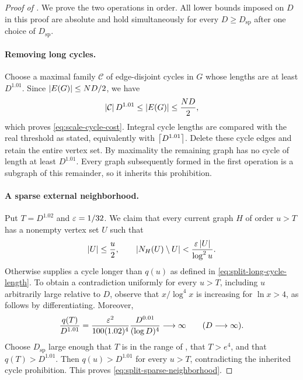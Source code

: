 \begin{proof}[Proof of ]
We prove the two operations in order.  All lower bounds imposed on $D$
in this proof are absolute and hold simultaneously for every
$D\ge D_{\mathrm{sp}}$ after one choice of $D_{\mathrm{sp}}$.

\paragraph{Removing long cycles.}
Choose a maximal family $\mathcal C$ of edge-disjoint cycles in $G$
whose lengths are at least $D^{1.01}$.  Since
$\left|E(G)\right|\le ND/2$, we have
\[
  \left|\mathcal C\right|D^{1.01}\le\left|E(G)\right|\le\frac{ND}{2},
\]
which proves \eqref{eq:scale-cycle-cost}.  Integral cycle lengths are
compared with the real threshold as stated, equivalently with
$\left\lceil D^{1.01}\right\rceil$.  Delete these cycle edges and retain the entire
vertex set.  By maximality the remaining graph has no cycle of length
at least $D^{1.01}$.  Every graph subsequently formed in the first
operation is a subgraph of this remainder, so it inherits this
prohibition.

\paragraph{A sparse external neighborhood.}
Put $T=D^{1.02}$ and $\varepsilon=1/32$.  We claim that every current graph
$H$ of order $u>T$ has a nonempty vertex set $U$ such that
\begin{equation}\label{eq:split-sparse-neighborhood}
  \left|U\right|\le\frac u2,\qquad
  \left|N_H(U)\setminus U\right|
    <\frac{\varepsilon\left|U\right|}{\log^2u}.
\end{equation}
Otherwise  supplies a cycle longer
than $q(u)$ as defined in \eqref{eq:split-long-cycle-length}.
To obtain a contradiction uniformly for every $u>T$, including $u$
arbitrarily large relative to $D$, observe that $x/\log^4x$ is
increasing for $\ln x>4$, as follows by differentiating.  Moreover,
\begin{equation}\label{eq:split-uniform-margin}
  \frac{q(T)}{D^{1.01}}
    =\frac{\varepsilon^2}{100(1.02)^4}
       \frac{D^{0.01}}{(\log D)^4}
    \longrightarrow\infty\qquad(D\longrightarrow\infty).
\end{equation}
Choose $D_{\mathrm{sp}}$ large enough that $T$ is in the range of
, that $T>e^4$, and that
$q(T)>D^{1.01}$.  Then $q(u)>D^{1.01}$ for every $u>T$,
contradicting the inherited cycle prohibition.  This proves
\eqref{eq:split-sparse-neighborhood}.


\end{proof}
